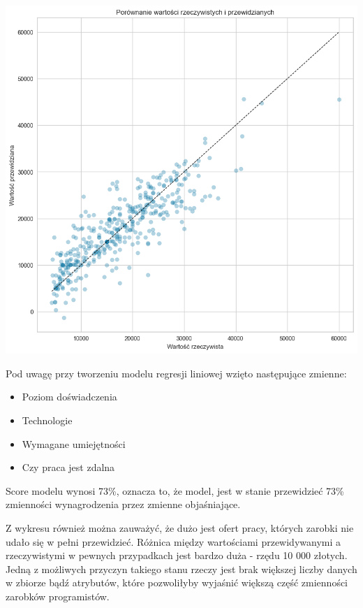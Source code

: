 \documentclass{article}
\begin{document}
\begin{center}
    \includegraphics[scale=0.5]{img/model_pred_1.png}
\end{center}

Pod uwagę przy tworzeniu modelu regresji liniowej wzięto następujące zmienne:
\begin{itemize}
    \item Poziom doświadczenia
    \item Technologie
    \item Wymagane umiejętności
    \item Czy praca jest zdalna
\end{itemize}

Score modelu wynosi 73\%, oznacza to, że model, jest w stanie przewidzieć 73\% zmienności wynagrodzenia przez zmienne objaśniające.

Z wykresu również można zauważyć, że dużo jest ofert pracy, których zarobki nie udało się w pełni przewidzieć.
Różnica między wartościami przewidywanymi a rzeczywistymi w pewnych przypadkach jest bardzo duża - rzędu 10 000 złotych.
Jedną z możliwych przyczyn takiego stanu rzeczy jest brak większej liczby danych w zbiorze bądź atrybutów,
które pozwoliłyby wyjaśnić większą część zmienności zarobków programistów.
\end{document}
